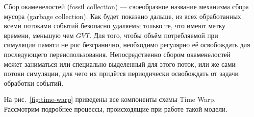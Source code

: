 \begin{itemize*}
    \item Сбор окаменелостей (\abbr fossil collection) --- своеобразное название механизма сбора мусора (\abbr garbage collection). Как будет показано дальше, из всех обработанных всеми потоками событий безопасно удаляемы только те, что имеют метку времени, меньшую чем $GVT$. Для того, чтобы объём потребляемой при симуляции памяти не рос безгранично, необходимо регулярно её освобождать для последующего переиспользования. Непосредственно сбором окаменелостей может заниматься или специально выделенный для этого поток, или же сами потоки симуляции, для чего их придётся периодически освобождать от задачи обработки событий.
\end{itemize*}

На рис.~\ref{fig:time-warp} приведены все компоненты схемы Time Warp. Рассмотрим подробнее процессы, происходящие при работе такой модели.

